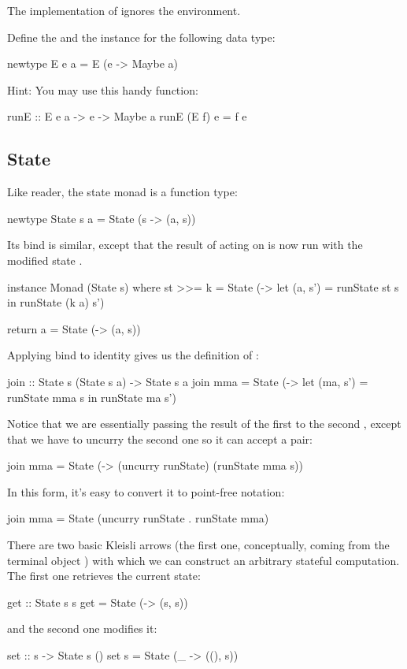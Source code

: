 \documentclass[DaoFP]{subfiles}
\begin{document}
The implementation of  ignores the environment.

\begin{exercise}
Define the  and the  instance for the following data type:
\begin{haskell}
newtype E e a = E (e -> Maybe a)
\end{haskell}
Hint: You may use this handy function:
\begin{haskell}
runE :: E e a -> e -> Maybe a
runE (E f) e = f e
\end{haskell}
\end{exercise}


\subsection{State}
Like reader, the state monad is a function type:
\begin{haskell}
newtype State s a = State (s -> (a, s))
\end{haskell}
Its bind is similar, except that the result of  acting on   is now run with the modified state .
\begin{haskell}
instance Monad (State s) where
  st >>= k = State (\s -> let (a, s') = runState st s
                          in runState (k a) s')
                          
  return a = State (\s -> (a, s))
\end{haskell}

Applying bind to identity gives us the definition of :
\begin{haskell}
join :: State s (State s a) -> State s a
join mma = State (\s -> let (ma, s') = runState mma s
                        in runState ma s')
\end{haskell}
Notice that we are essentially passing the result of the first  to the second , except that we have to uncurry the second one so it can accept a pair:
                             
\begin{haskell}
join mma = State (\s -> (uncurry runState) (runState mma s))
\end{haskell}
In this form, it's easy to convert it to point-free notation:
\begin{haskell}
join mma = State (uncurry runState . runState mma)
\end{haskell}

There are two basic Kleisli arrows (the first one, conceptually, coming from the terminal object \hask{()}) with which we can construct an arbitrary stateful computation. The first one retrieves the current state:
\begin{haskell}
get :: State s s
get = State (\s -> (s, s))
\end{haskell}
and the second one modifies it:
\begin{haskell}
set :: s -> State s ()
set s = State (\_ -> ((), s))
\end{haskell}
\end{document}
